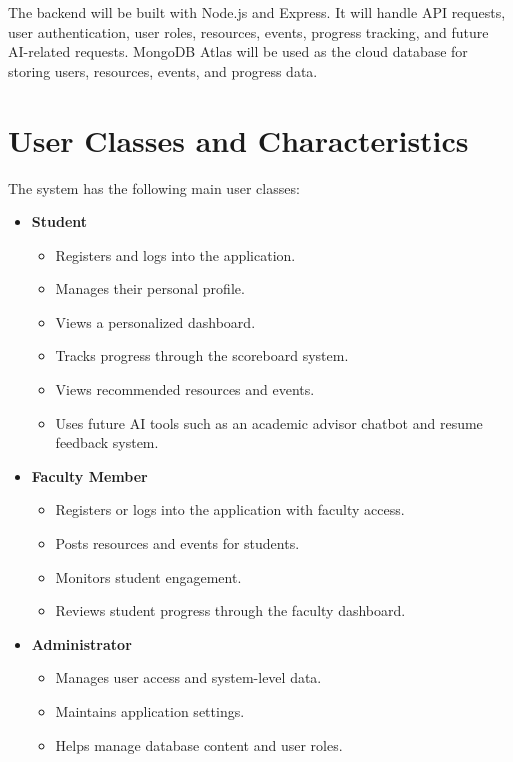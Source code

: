 \documentclass{scrreprt}
\begin{document}
The backend will be built with Node.js and Express. It will handle API requests, user authentication, user roles, resources, events, progress tracking, and future AI-related requests. MongoDB Atlas will be used as the cloud database for storing users, resources, events, and progress data.

\section{User Classes and Characteristics}
The system has the following main user classes:

\begin{itemize}
    \item \textbf{Student}
    \begin{itemize}
        \item Registers and logs into the application.
        \item Manages their personal profile.
        \item Views a personalized dashboard.
        \item Tracks progress through the scoreboard system.
        \item Views recommended resources and events.
        \item Uses future AI tools such as an academic advisor chatbot and resume feedback system.
    \end{itemize}

    \item \textbf{Faculty Member}
    \begin{itemize}
        \item Registers or logs into the application with faculty access.
        \item Posts resources and events for students.
        \item Monitors student engagement.
        \item Reviews student progress through the faculty dashboard.
    \end{itemize}

    \item \textbf{Administrator}
    \begin{itemize}
        \item Manages user access and system-level data.
        \item Maintains application settings.
        \item Helps manage database content and user roles.
    \end{itemize}
\end{itemize}
\end{document}
